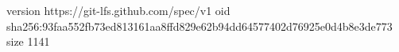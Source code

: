 version https://git-lfs.github.com/spec/v1
oid sha256:93faa552fb73ed813161aa8ffd829e62b94dd64577402d76925e0d4b8e3de773
size 1141
